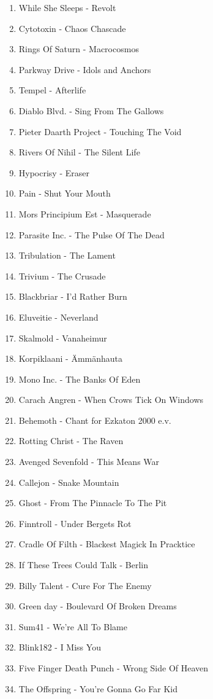 \begin{enumerate}
	\item While She Sleeps - Revolt
	\item Cytotoxin - Chaos Chascade
	\item Rings Of Saturn - Macrocosmos 
	\item Parkway Drive - Idols and Anchors
	\item Tempel - Afterlife
	\item Diablo Blvd. - Sing From The Gallows 
	\item Pieter Daarth Project - Touching The Void
	\item Rivers Of Nihil - The Silent Life
	\item Hypocrisy - Eraser
	\item Pain - Shut Your Mouth
	\item Mors Principium Est - Masquerade
	\item Parasite Inc. - The Pulse Of The Dead
	\item Tribulation - The Lament
	\item Trivium - The Crusade
	\item Blackbriar - I'd Rather Burn	
	\item Eluveitie - Neverland
	\item Skalmold - Vanaheimur
	\item Korpiklaani - Ämmänhauta
	\item Mono Inc. - The Banks Of Eden
	\item Carach Angren - When Crows Tick On Windows 
	\item Behemoth - Chant for Ezkaton 2000 e.v.
	\item Rotting Christ - The Raven
	\item Avenged Sevenfold - This Means War
	\item Callejon - Snake Mountain
	\item Ghost - From The Pinnacle To The Pit
	\item Finntroll - Under Bergets Rot
	\item Cradle Of Filth - Blackest Magick In Pracktice
	\item If These Trees Could Talk - Berlin
	\item Billy Talent - Cure For The Enemy
	\item Green day - Boulevard Of Broken Dreams
	\item Sum41 - We're All To Blame
	\item Blink182 - I Miss You
	\item Five Finger Death Punch - Wrong Side Of Heaven
	\item The Offspring - You're Gonna Go Far Kid

\end{enumerate}
